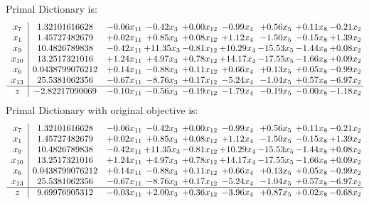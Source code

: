 \documentclass[9pt]{article}
\begin{document}
Primal Dictionary is:
\[\begin{array}{c| c c@{\hskip 2pt} c@{\hskip 2pt} c@{\hskip 2pt} c@{\hskip 2pt} c@{\hskip 2pt} c@{\hskip 2pt} c@{\hskip 2pt} }
 x_{7}   &  1.32101616628 & -0.06 x_{11} & -0.42 x_{3} & +  0.00 x_{12} & -0.99 x_{4} & +  0.56 x_{5} & +  0.11 x_{8} & -0.21 x_{2}\\
 x_{1}   &  1.45727482679 & +  0.02 x_{11} & +  0.85 x_{3} & +  0.08 x_{12} & +  1.12 x_{4} & -1.50 x_{5} & -0.15 x_{8} & +  1.39 x_{2}\\
 x_{9}   &  10.4826789838 & -0.42 x_{11} & + 11.35 x_{3} & -0.81 x_{12} & + 10.29 x_{4} & -15.53 x_{5} & -1.44 x_{8} & +  0.08 x_{2}\\
 x_{10}   &  13.2517321016 & +  1.24 x_{11} & +  4.97 x_{3} & +  0.78 x_{12} & + 14.17 x_{4} & -17.55 x_{5} & -1.66 x_{8} & +  0.09 x_{2}\\
 x_{6}   &  0.0438799076212 & +  0.14 x_{11} & -0.88 x_{3} & +  0.11 x_{12} & +  0.66 x_{4} & +  0.13 x_{5} & +  0.05 x_{8} & -0.99 x_{2}\\
 x_{13}   &  25.5381062356 & -0.67 x_{11} & -8.76 x_{3} & +  0.17 x_{12} & -5.24 x_{4} & -1.04 x_{5} & +  0.57 x_{8} & -6.97 x_{2}\\
\hline
z    &  -2.82217090069 & -0.10 x_{11} & -0.56 x_{3} & -0.19 x_{12} & -1.79 x_{4} & -0.19 x_{5} & -0.00 x_{8} & -1.18 x_{2}\\
\end{array}\]
Primal Dictionary with original objective is:
\[\begin{array}{c| c c@{\hskip 2pt} c@{\hskip 2pt} c@{\hskip 2pt} c@{\hskip 2pt} c@{\hskip 2pt} c@{\hskip 2pt} c@{\hskip 2pt} }
 x_{7}   &  1.32101616628 & -0.06 x_{11} & -0.42 x_{3} & +  0.00 x_{12} & -0.99 x_{4} & +  0.56 x_{5} & +  0.11 x_{8} & -0.21 x_{2}\\
 x_{1}   &  1.45727482679 & +  0.02 x_{11} & +  0.85 x_{3} & +  0.08 x_{12} & +  1.12 x_{4} & -1.50 x_{5} & -0.15 x_{8} & +  1.39 x_{2}\\
 x_{9}   &  10.4826789838 & -0.42 x_{11} & + 11.35 x_{3} & -0.81 x_{12} & + 10.29 x_{4} & -15.53 x_{5} & -1.44 x_{8} & +  0.08 x_{2}\\
 x_{10}   &  13.2517321016 & +  1.24 x_{11} & +  4.97 x_{3} & +  0.78 x_{12} & + 14.17 x_{4} & -17.55 x_{5} & -1.66 x_{8} & +  0.09 x_{2}\\
 x_{6}   &  0.0438799076212 & +  0.14 x_{11} & -0.88 x_{3} & +  0.11 x_{12} & +  0.66 x_{4} & +  0.13 x_{5} & +  0.05 x_{8} & -0.99 x_{2}\\
 x_{13}   &  25.5381062356 & -0.67 x_{11} & -8.76 x_{3} & +  0.17 x_{12} & -5.24 x_{4} & -1.04 x_{5} & +  0.57 x_{8} & -6.97 x_{2}\\
\hline
z    &  9.69976905312 & -0.03 x_{11} & +  2.00 x_{3} & +  0.36 x_{12} & -3.96 x_{4} & +  0.87 x_{5} & +  0.02 x_{8} & -0.68 x_{2}\\
\end{array}\]
\end{document}
